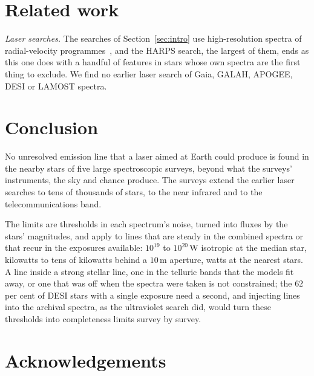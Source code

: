 \documentclass[3p,11pt]{elsarticle}
\begin{document}
\section{Related work}\label{sec:related}

\emph{Laser searches.} The searches of Section~\ref{sec:intro} use high-resolution
spectra of radial-velocity programmes~\cite{ReinesMarcy2002,TellisMarcy2015,TellisMarcy2017,Zuckerman2023,FieldsGoodman2025},
and the HARPS search, the largest of them, ends as this one does with a handful of
features in stars whose own spectra are the first thing to exclude. We find no earlier
laser search of Gaia, GALAH, APOGEE, DESI or LAMOST spectra.

\section{Conclusion}\label{sec:conclusion}

No unresolved emission line that a laser aimed at Earth could produce is found in the
nearby stars of five large spectroscopic surveys, beyond what the surveys' instruments,
the sky and chance produce. The surveys extend the earlier laser searches to tens of
thousands of stars, to the near infrared and to the telecommunications band.

The limits are thresholds in each spectrum's noise, turned into fluxes by the stars'
magnitudes, and apply to lines that are steady in the combined spectra or that recur in
the exposures available: $10^{19}$ to $10^{20}$\,W isotropic at the median star,
kilowatts to tens of kilowatts behind a $10$\,m aperture, watts at the nearest stars.
A line inside a strong stellar line, one in the telluric bands that
the models fit away, or one that was off when the spectra were taken is not constrained;
the $62$ per cent of DESI stars with a single exposure need a second, and injecting
lines into the archival spectra, as the ultraviolet search did, would turn these
thresholds into completeness limits survey by survey.

\section*{Acknowledgements}
\end{document}
